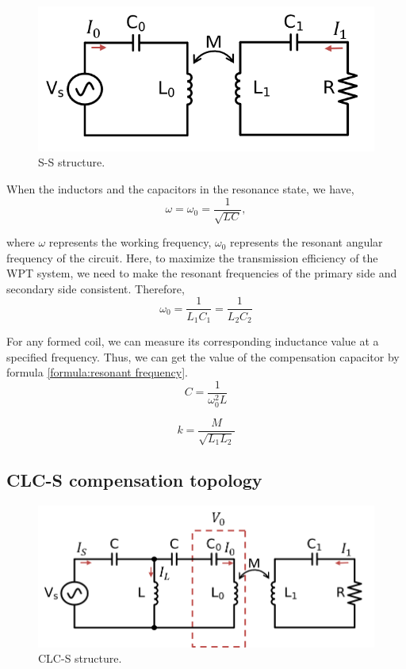 \begin{figure}[!t]
    \centering
    \includegraphics[width=0.7\linewidth]{images/2_ss_scheme.png}
    \caption{S-S structure.}
    \label{fig:ss topology}
\end{figure}

When the inductors and the capacitors in the resonance state, we have,
\begin{equation}
    \omega=\omega _0=\frac{1}{\sqrt{LC}},
    \label{formula:resonant frequency}
\end{equation}

where $\omega$ represents the working frequency, $\omega _0$ represents the resonant angular frequency of the circuit. Here, to maximize the transmission efficiency of the WPT system, we need to make the resonant frequencies of the primary side and secondary side consistent. Therefore,
\begin{equation}
    \omega _0 = \frac{1}{L_1C_1} = \frac{1}{L_2C_2}
\end{equation}

For any formed coil, we can measure its corresponding inductance value at a specified frequency. Thus, we can get the value of the compensation capacitor by formula \ref{formula:resonant frequency}.
\begin{equation}
    C = \frac{1}{\omega_0^2 L}
\end{equation}

\begin{equation}
    k=\frac{M}{\sqrt{L_1L_2}}
\end{equation}


\subsection{CLC-S compensation topology}
\begin{figure}[!t]
    \centering
    \includegraphics[width=0.93\linewidth]{images/2_clc_s_scheme.png}
    \caption{CLC-S structure.}
    \label{fig:clcs topology}
\end{figure}


